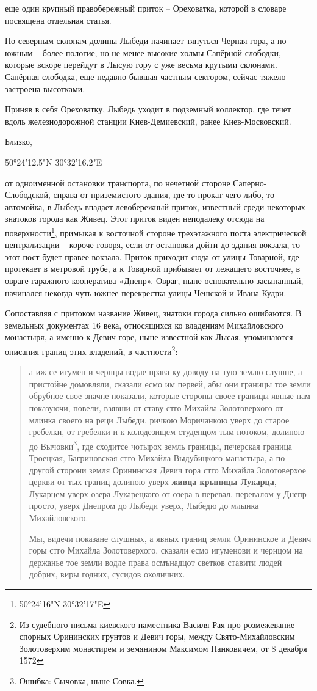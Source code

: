 еще один крупный правобережный приток – Ореховатка, которой в словаре посвящена отдельная статья.

По северным склонам долины Лыбеди начинает тянуться Черная гора, а по южным – более пологие, но не менее высокие холмы Сапёрной слободки, которые вскоре перейдут в Лысую гору с уже весьма крутыми склонами. Сапёрная слободка, еще недавно бывшая частным сектором, сейчас тяжело застроена высотками.

Приняв в себя Ореховатку, Лыбедь уходит в подземный коллектор, где течет вдоль  железнодорожной станции Киев-Демиевский, ранее Киев-Московский.

Близко, 

50°24'12.5"N 30°32'16.2"E

от одноименной остановки транспорта, по нечетной стороне Саперно-Сло\-бодской, справа от приземистого здания, где то прокат чего-либо, то автомойка, в Лыбедь впадает левобережный приток, известный среди некоторых знатоков города как Живец. Этот приток виден неподалеку отсюда на поверхности\footnote{50°24'16"N 30°32'17"E}, примыкая к восточной стороне трехэтажного поста электрической централизации – короче говоря, если от остановки дойти до здания вокзала, то этот пост будет правее вокзала. Приток приходит сюда от улицы Товарной, где протекает в метровой трубе, а к Товарной прибывает от лежащего восточнее, в овраге гаражного кооператива «Днепр». Овраг, ныне основательно засыпанный, начинался некогда чуть южнее перекрестка улицы Чешской и Ивана Кудри.

Сопоставляя с притоком название Живец, знатоки города сильно ошибаются. В земельных документах 16 века, относящихся ко владениям Михайловского монастыря, а именно к Девич горе, ныне известной как Лысая, упоминаются описания границ этих владений, в частности\footnote{Из судебного письма киевского наместника Василя Рая про розмежевание спорных Орининских грунтов и Девич горы, между Свято-Михайловским
Золотоверхим монастирем и земянином Максимом Панковичем, от 8 декабря 1572}:

\begin{quotation}
а иж се игумен и чернцы водле права ку доводу на тую землю слушне, а пристойне домовляли, сказали есмо им первей, абы они границы тое земли обрубное свое значне показали, которые стороны своее границы явные нам показуючи, повели, взявши от ставу стго Михайла Золотоверхого от млинка своего на реци Лыбеди, ричкою Моричанкою уверх до старое гребелки, от гребелки и к колодезищем студенцом тым потоком, долиною до Вычовки\footnote{Ошибка: Сычовка, ныне Совка.}, где сходитсе чотырох земль границы, печерская граница Троецкая, Багриновская стго Михайла Выдубицкого манастыра, а по другой сторони земля Орининская Девич гора стго Михайла Золотоверхое церкви от тых границ долиною уверх \textbf{живца крыницы Лукарца}, Лукарцем уверх озера Лукарецкого от озера в перевал, перевалом у Днепр просто, уверх Днепром до Лыбеди уверх, Лыбедю до млынка Михайловского.

Мы, видечи показане слушных, а явных границ земли Орининское и Девич горы стго Михайла Золотоверхого, сказали есмо игуменови и чернцом на держанье тое земли водле права осмънадцот светков ставити людей добрих, виры годних, сусидов околичних.\end{quotation}
 

